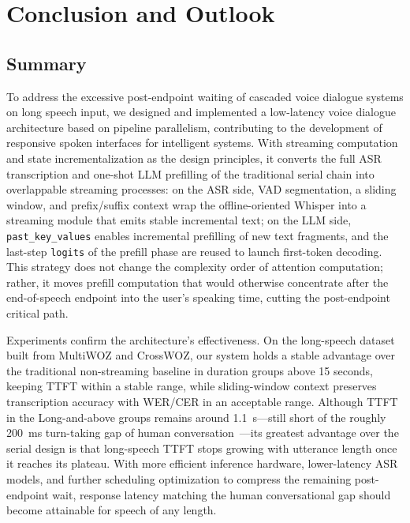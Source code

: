 \documentclass[conference]{IEEEtran}
\begin{document}
\section{Conclusion and Outlook}\label{sec:conclusion}

\subsection{Summary}

To address the excessive post-endpoint waiting of cascaded voice dialogue systems on long speech input, we designed and implemented a low-latency voice dialogue architecture based on pipeline parallelism, contributing to the development of responsive spoken interfaces for intelligent systems. With streaming computation and state incrementalization as the design principles, it converts the full ASR transcription and one-shot LLM prefilling of the traditional serial chain into overlappable streaming processes: on the ASR side, VAD segmentation, a sliding window, and prefix/suffix context wrap the offline-oriented Whisper into a streaming module that emits stable incremental text; on the LLM side, \texttt{past\_key\_values} enables incremental prefilling of new text fragments, and the last-step \texttt{logits} of the prefill phase are reused to launch first-token decoding. This strategy does not change the complexity order of attention computation; rather, it moves prefill computation that would otherwise concentrate after the end-of-speech endpoint into the user's speaking time, cutting the post-endpoint critical path.

Experiments confirm the architecture's effectiveness. On the long-speech dataset built from MultiWOZ and CrossWOZ, our system holds a stable advantage over the traditional non-streaming baseline in duration groups above 15 seconds, keeping TTFT within a stable range, while sliding-window context preserves transcription accuracy with WER/CER in an acceptable range. Although TTFT in the Long-and-above groups remains around 1.1~s---still short of the roughly 200~ms turn-taking gap of human conversation~\cite{ref21}---its greatest advantage over the serial design is that long-speech TTFT stops growing with utterance length once it reaches its plateau. With more efficient inference hardware, lower-latency ASR models, and further scheduling optimization to compress the remaining post-endpoint wait, response latency matching the human conversational gap should become attainable for speech of any length.
\end{document}
